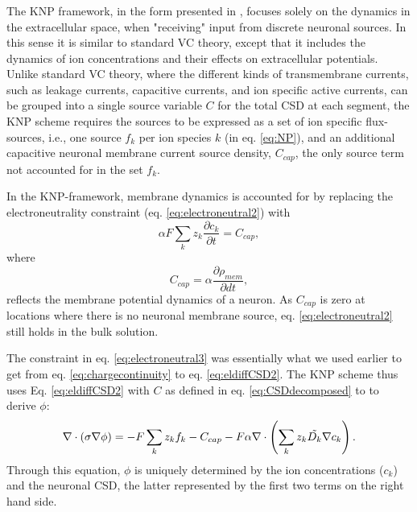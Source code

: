 \subsubsection{}
The KNP framework, in the form presented in \cite{Solbra2018}, focuses solely on the dynamics in the extracellular space, when "receiving" input from discrete neuronal sources. In this sense it is similar to standard VC theory, except that it includes the dynamics of ion concentrations and their effects on extracellular potentials. Unlike standard VC theory, where the different kinds of transmembrane currents, such as leakage currents, capacitive currents, and ion specific active currents, can be grouped into a single source variable $C$ for the total CSD at each segment, the KNP scheme requires the sources to be expressed as a set of ion specific flux-sources, i.e., one source $f_k$ per ion species $k$ (in eq. \ref{eq:NP}), and an additional capacitive neuronal membrane current source density, $C_{cap}$, the only source term not accounted for in the set $f_k$.

In the KNP-framework, membrane dynamics is accounted for by replacing the electroneutrality constraint (eq. \ref{eq:electroneutral2}) with
\begin{equation}
\alpha F \sum_k{z_k \frac{\partial c_k}{\partial t}} = C_{cap},
\label{eq:electroneutral3}
\end{equation}
where 
\begin{equation}
C_{cap} = {\alpha}\frac{\partial \rho_{mem}}{\partial dt},
\label{eq:Andreas}
\end{equation}
reflects the membrane potential dynamics of a neuron. As $C_{cap}$ is zero at locations where there is no neuronal membrane source, eq. \ref{eq:electroneutral2} still holds in the bulk solution. 

The constraint in eq. \ref{eq:electroneutral3} was essentially what we used earlier to get from eq. \ref{eq:chargecontinuity} to eq. \ref{eq:eldiffCSD2}. The KNP scheme thus uses Eq. \ref{eq:eldiffCSD2} with $C$ as defined in eq.  \ref{eq:CSDdecomposed} to to derive $\phi$:
\begin{equation}
\nabla \cdot (\sigma\nabla\phi) = - F \sum_k z_k f_k -  C_{cap} - F\alpha \nabla \cdot \left (\sum_k{z_k \tilde{D_k}{\bf \nabla} c_{k}} \right).
\label{eq:KNPfinal}
\end{equation}
Through this equation, $\phi$ is uniquely determined by the ion concentrations ($c_k$) and the neuronal CSD, the latter represented by the first two terms on the right hand side.


